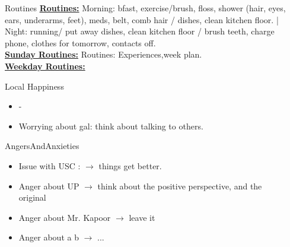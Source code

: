 \begin{columns}
\begin{column}{0.10\linewidth}
\end{column}
  \begin{column}{0.10\linewidth}
    \begin{block}{Routines}
      { \tiny \underline{\bf Routines:} Morning: bfast, exercise/brush,
        floss, shower (hair, eyes, ears, underarms, feet), meds, belt,
        comb hair / dishes, clean kitchen floor. |  Night: running/ put
        away dishes, clean kitchen floor / brush teeth, charge phone,
        clothes for tomorrow, contacts off.}\\
      {\tiny \underline{\bf Sunday Routines:} Routines:
        Experiences,week plan.}\\ 
      {\tiny \underline{\bf Weekday Routines:}}\\
    \end{block} 
    \begin{block}{Local Happiness}
      \begin{itemize} 
        \tiny \item \tiny -
      \item \tiny Worrying about gal: think about talking to others.
      \end{itemize} 
    \end{block}
    \begin{block}{AngersAndAnxieties}
      \begin{itemize}
        \item \tiny Issue with USC : $\rightarrow$ things get better. 
        \tiny \item \tiny Anger about UP $\rightarrow$ think about the positive
        perspective, and the original
      \item \tiny Anger about Mr. Kapoor $\rightarrow$  leave it
      \item \tiny Anger about a b  $\rightarrow$ ...

\end{itemize}
\end{block}
\end{column}
\end{columns}
